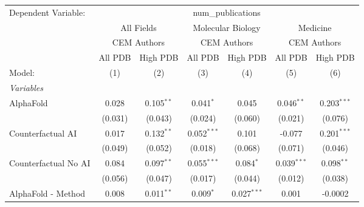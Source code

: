 \begingroup
\centering
\begin{tabular}{lcccccc}
   \tabularnewline \midrule \midrule
   Dependent Variable: & \multicolumn{6}{c}{num\_publications}\\
 & \multicolumn{2}{c}{All Fields} & \multicolumn{2}{c}{Molecular Biology} & \multicolumn{2}{c}{Medicine} \\
\cmidrule(lr){2-3} \cmidrule(lr){4-5} \cmidrule(lr){6-7}
 & \multicolumn{2}{c}{CEM Authors} & \multicolumn{2}{c}{CEM Authors} & \multicolumn{2}{c}{CEM Authors} \\
\cmidrule(lr){2-3} \cmidrule(lr){4-5} \cmidrule(lr){6-7}
 & \multicolumn{1}{c}{All PDB} & \multicolumn{1}{c}{High PDB} & \multicolumn{1}{c}{All PDB} & \multicolumn{1}{c}{High PDB} & \multicolumn{1}{c}{All PDB} & \multicolumn{1}{c}{High PDB} \\
\cmidrule(lr){2-2} \cmidrule(lr){3-3} \cmidrule(lr){4-4} \cmidrule(lr){5-5} \cmidrule(lr){6-6} \cmidrule(lr){7-7}
   Model:                                                     & (1)           & (2)          & (3)           & (4)           & (5)           & (6)\\  
   \midrule
   \emph{Variables}\\
   AlphaFold                                                  & 0.028         & 0.105$^{**}$ & 0.041$^{*}$   & 0.045         & 0.046$^{**}$  & 0.203$^{***}$\\   
                                                              & (0.031)       & (0.043)      & (0.024)       & (0.060)       & (0.021)       & (0.076)\\   
   Counterfactual AI                                          & 0.017         & 0.132$^{**}$ & 0.052$^{***}$ & 0.101         & -0.077        & 0.201$^{***}$\\   
                                                              & (0.049)       & (0.052)      & (0.018)       & (0.068)       & (0.071)       & (0.046)\\   
   Counterfactual No AI                                       & 0.084         & 0.097$^{**}$ & 0.055$^{***}$ & 0.084$^{*}$   & 0.039$^{***}$ & 0.098$^{**}$\\   
                                                              & (0.056)       & (0.047)      & (0.017)       & (0.044)       & (0.012)       & (0.038)\\   
   AlphaFold - Method                                         & 0.008         & 0.011$^{**}$ & 0.009$^{*}$   & 0.027$^{***}$ & 0.001         & -0.0002\\   

\end{tabular}
